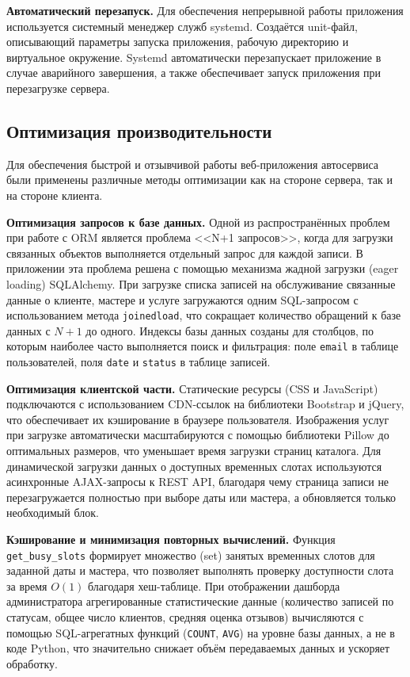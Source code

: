 \documentclass[14pt,a4paper,oneside]{extarticle}
\begin{document}
\textbf{Автоматический перезапуск.} Для обеспечения непрерывной работы приложения используется системный менеджер служб systemd. Создаётся unit-файл, описывающий параметры запуска приложения, рабочую директорию и виртуальное окружение. Systemd автоматически перезапускает приложение в случае аварийного завершения, а также обеспечивает запуск приложения при перезагрузке сервера.

\subsection{Оптимизация производительности}

Для обеспечения быстрой и отзывчивой работы веб-приложения автосервиса были применены различные методы оптимизации как на стороне сервера, так и на стороне клиента.

\textbf{Оптимизация запросов к базе данных.} Одной из распространённых проблем при работе с ORM является проблема <<N+1 запросов>>, когда для загрузки связанных объектов выполняется отдельный запрос для каждой записи. В приложении эта проблема решена с помощью механизма жадной загрузки (eager loading) SQLAlchemy. При загрузке списка записей на обслуживание связанные данные о клиенте, мастере и услуге загружаются одним SQL-запросом с использованием метода \texttt{joinedload}, что сокращает количество обращений к базе данных с $N+1$ до одного. Индексы базы данных созданы для столбцов, по которым наиболее часто выполняется поиск и фильтрация: поле \texttt{email} в таблице пользователей, поля \texttt{date} и \texttt{status} в таблице записей.

\textbf{Оптимизация клиентской части.} Статические ресурсы (CSS и JavaScript) подключаются с использованием CDN-ссылок на библиотеки Bootstrap и jQuery, что обеспечивает их кэширование в браузере пользователя. Изображения услуг при загрузке автоматически масштабируются с помощью библиотеки Pillow до оптимальных размеров, что уменьшает время загрузки страниц каталога. Для динамической загрузки данных о доступных временных слотах используются асинхронные AJAX-запросы к REST API, благодаря чему страница записи не перезагружается полностью при выборе даты или мастера, а обновляется только необходимый блок.

\textbf{Кэширование и минимизация повторных вычислений.} Функция \texttt{get\_busy\_slots} формирует множество (set) занятых временных слотов для заданной даты и мастера, что позволяет выполнять проверку доступности слота за время $O(1)$ благодаря хеш-таблице. При отображении дашборда администратора агрегированные статистические данные (количество записей по статусам, общее число клиентов, средняя оценка отзывов) вычисляются с помощью SQL-агрегатных функций (\texttt{COUNT}, \texttt{AVG}) на уровне базы данных, а не в коде Python, что значительно снижает объём передаваемых данных и ускоряет обработку.
\end{document}
